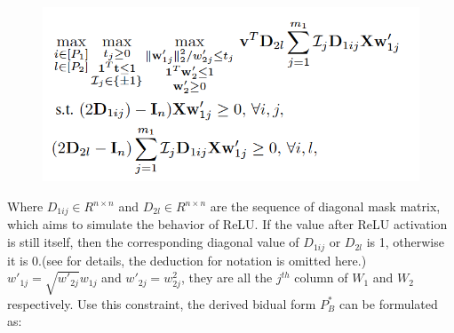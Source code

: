 \documentclass{article}
\begin{document}
\begin{figure}[H]
    \centering
    \includegraphics[scale=0.6]{ProjectSubmissionFiles/Fig2.png}
\end{figure}
Where $D_{1ij} \in R^{n\times n}$ and $D_{2l} \in R^{ n\times n}$ are the sequence of diagonal mask matrix, which aims to simulate the behavior of ReLU. If the value after ReLU activation is still itself, then the corresponding diagonal value of $D_{1ij}$ or $D_{2l}$ is 1, otherwise it is 0.(see \cite{deeprelu} for details, the deduction for notation is omitted here.) $w'_{1j}=\sqrt{w'_{2j}}w_{1j}$ and $w'_{2j}=w_{2j}^2$, they are all the $j^{th}$ column of $W_1$ and $W_2$ respectively. Use this constraint, the derived bidual form $P_B^*$ can be formulated as:
\end{document}

